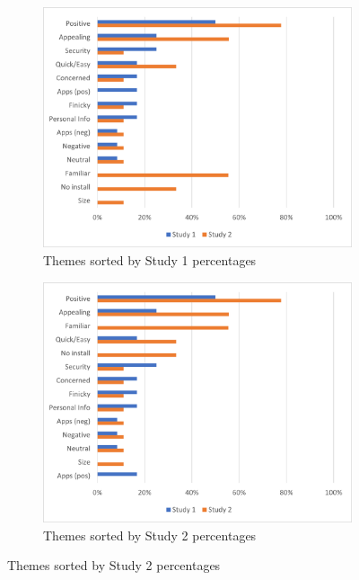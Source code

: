 \documentclass[thesis]{fputhesis}
\begin{document}
\begin{body}
\begin{figure}[h]
    \centering
    \begin{subfigure}[]{.45\textwidth}
        \centering
        \includegraphics[width=\textwidth]{Images/web app themes study 1.png}
        \caption{Themes sorted by Study 1 percentages}
        \label{fig:webapp1}
    \end{subfigure}
    \begin{subfigure}[]{.45\textwidth}
        \centering
        \includegraphics[width=\textwidth]{Images/web app themes study 2.png}
        \caption{Themes sorted by Study 2 percentages}
        \label{fig:webapp2}
    \end{subfigure}

\end{figure}
\end{body}
\end{document}
